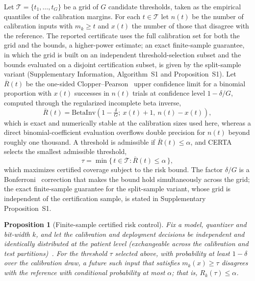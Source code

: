 \documentclass[pdflatex,sn-mathphys-num]{sn-jnl}%
\newtheorem{proposition}{Proposition}
\theoremstyle{thmstyleone}%
\theoremstyle{thmstyletwo}%
\theoremstyle{thmstylethree}%
\begin{document}
Let $\mathcal{T}=\{t_1,\dots,t_G\}$ be a grid of $G$ candidate thresholds, taken as the empirical
quantiles of the calibration margins. For each $t\in\mathcal{T}$ let $n(t)$ be the number of
calibration inputs with $m_k\ge t$ and $x(t)$ the number of those that disagree with the reference. The
reported certificate uses the full calibration set for both the grid and the bounds, a higher-power
estimate; an exact finite-sample guarantee, in which the grid is built on an independent
threshold-selection subset and the bounds evaluated on a disjoint certification subset, is given by the
split-sample variant (Supplementary Information, Algorithm~S1 and Proposition~S1).
Let $\overline{R}(t)$ be the one-sided Clopper--Pearson~\cite{clopper1934} upper confidence limit for a binomial
proportion with $x(t)$ successes in $n(t)$ trials at confidence level $1-\delta/G$, computed through
the regularized incomplete beta inverse,
\begin{equation}
\overline{R}(t)=\mathrm{BetaInv}\!\left(1-\tfrac{\delta}{G};\ x(t)+1,\ n(t)-x(t)\right),
\end{equation}
which is exact and numerically stable at the calibration sizes used here, whereas a direct
binomial-coefficient evaluation overflows double precision for $n(t)$ beyond roughly one thousand.
A threshold is admissible if $\overline{R}(t)\le\alpha$, and CERTA selects the smallest admissible
threshold,
\begin{equation}
\tau=\min\{\,t\in\mathcal{T}: \overline{R}(t)\le\alpha\,\},
\end{equation}
which maximizes certified coverage subject to the risk bound. The factor $\delta/G$ is a Bonferroni~\cite{dunn1961bonferroni}
correction that makes the bound hold simultaneously across the grid; the exact finite-sample guarantee
for the split-sample variant, whose grid is independent of the certification sample, is stated in
Supplementary Proposition~S1.
 
\begin{proposition}[Finite-sample certified risk control]
Fix a model, quantizer and bit-width $k$, and let the calibration and deployment decisions be
independent and identically distributed at the patient level (exchangeable across the calibration and
test partitions)~\cite{vovk2005algorithmic}.
For the threshold $\tau$ selected above, with probability at least $1-\delta$ over the calibration
draw, a future such input that satisfies $m_k(x)\ge\tau$ disagrees with the reference with
conditional probability at most $\alpha$; that is, $R_k(\tau)\le\alpha$.
\end{proposition}
 
\end{document}
